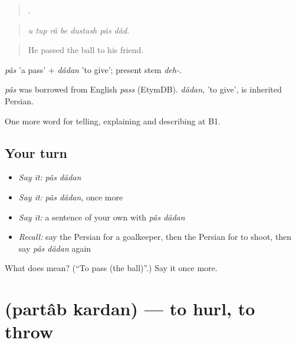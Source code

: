 \begin{quote}
      .
\end{quote}

\begin{quote}
\emph{u tup râ be dustash pâs dâd.}
\end{quote}

\begin{quote}
He passed the ball to his friend.
\end{quote}

\emph{pâs} 'a pass' + \emph{dâdan} 'to give'; present stem \emph{deh-}.

\begin{cousinweb}
\emph{pâs} was borrowed from English \emph{pass} (EtymDB). \emph{dâdan}, 'to give', is inherited Persian.
\end{cousinweb}

\begin{grammarlens}[title={What you've built}]
One more word for telling, explaining and describing at B1.
\end{grammarlens}

\subsection*{Your turn}
\begin{itemize}
\raggedright
  \item \emph{Say it:} \emph{pâs dâdan}
  \item \emph{Say it:} \emph{pâs dâdan}, once more
  \item \emph{Say it:} a sentence of your own with \emph{pâs dâdan}
  \item \emph{Recall:} say the Persian for a goalkeeper, then the Persian for to shoot, then say \emph{pâs dâdan} again
\end{itemize}

\begin{tcolorbox}[breakable,colback=teal!4,colframe=teal!35!black,title={Before you move on}]
What does   mean? (\textquotedblleft{}To pass (the ball)\textquotedblright{}.) Say it once more.
\end{tcolorbox}
\section[\texorpdfstring{\fa{پرتاب} \fa{کردن} (partâb kardan)}{پرتاب کردن (partâb kardan)}]{  (partâb kardan) — to hurl, to throw}

